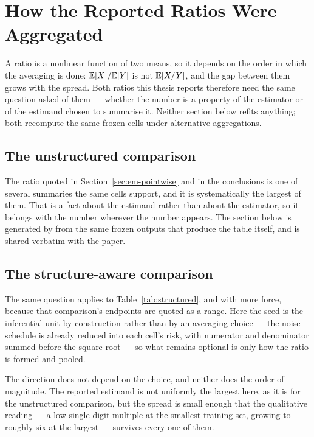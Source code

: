 \chapter{How the Reported Ratios Were Aggregated}\label{app:aggregation-chapter}

A ratio is a nonlinear function of two means, so it depends on the order in
which the averaging is done: $\mathbb{E}[X]/\mathbb{E}[Y]$ is not $\mathbb{E}[X/Y]$, and the gap
between them grows with the spread. Both ratios this thesis reports therefore
need the same question asked of them --- whether the number is a property of
the estimator or of the estimand chosen to summarise it. Neither section
below refits anything; both recompute the same frozen cells under alternative
aggregations.

\section{The unstructured comparison}

The ratio quoted in Section~\ref{sec:em-pointwise} and in the conclusions is one
of several summaries the same cells support, and it is systematically the
largest of them. That is a fact about the estimand rather than about the
estimator, so it belongs with the number wherever the number appears. The
section below is generated by
 from the same frozen outputs
that produce the table itself, and is shared verbatim with the paper.



\section{The structure-aware comparison}

The same question applies to Table~\ref{tab:structured}, and with more force,
because that comparison's endpoints are quoted as a range. Here the seed is the
inferential unit by construction rather than by an averaging choice --- the
noise schedule is already reduced into each cell's risk, with numerator and
denominator summed before the square root --- so what remains optional is only
how the ratio is formed and pooled.



\noindent The direction does not depend on the choice, and neither does the
order of magnitude. The reported estimand is not uniformly the largest here, as
it is for the unstructured comparison, but the spread is small enough that the
qualitative reading --- a low single-digit multiple at the smallest training set,
growing to roughly six at the largest --- survives every one of them.
